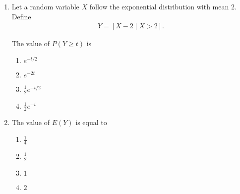 \documentclass[journal]{IEEEtran}
\numberwithin{equation}{enumi}
\numberwithin{figure}{enumi}
\begin{document}
\begin{enumerate}
\item
Let a random variable $X$ follow the exponential distribution with mean 2. Define
\begin{align}
    Y = [X - 2 \mid X > 2].
\end{align}

The value of $P(Y \geq t)$ is
\hfill{}
\begin{multicols}{4}
\begin{enumerate}
    \item $e^{-t/2}$
    \item $e^{-2t}$
    \item $\frac{1}{2} e^{-t/2}$
    \item $\frac{1}{2} e^{-t}$
\end{enumerate}
\end{multicols}

\item
The value of $E(Y)$ is equal to
\hfill{}
\begin{multicols}{4}
\begin{enumerate}
    \item $\frac{1}{4}$
    \item $\frac{1}{2}$
    \item $1$
    \item $2$
\end{enumerate}
\end{multicols}


\end{enumerate}
\end{document}

